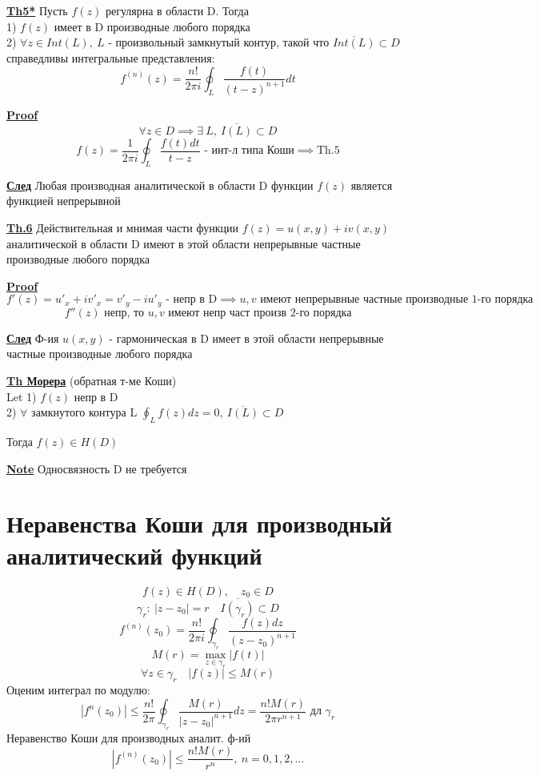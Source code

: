 \documentclass[a4paper]{article}
\begin{document}
\begin{tcolorbox}
\textbf{\underline{Th5*}} Пусть $ f(z) $ регулярна в области D. Тогда\\
1) $ f(z) $ имеет в D производные любого порядка\\
2) $ \forall z \in Int(L), \ L $ - произвольный замкнутый контур, такой что 
$ \overline{Int(L)} \subset D $ справедливы интегральные представления:
\[
    f^{(n)}(z) = \frac{n!}{2\pi i} \oint_L \frac{f(t)}{(t-z)^{n+1}} dt
\]

\textbf{\underline{Proof}}
\[
    \forall z \in D \implies \exists \ L, \ \overline{I(L)} \subset D
\]
\[
    f(z) = \frac{1}{2 \pi i} \oint_L \frac{f(t)dt}{t-z} \text{ - инт-л типа Коши}
    \implies \text{Th.5}
\]

\textbf{\underline{След}} Любая производная аналитической в области D функции $ f(z) $ является
функцией непрерывной
\end{tcolorbox}

\begin{tcolorbox}
\textbf{\underline{Th.6}} Действительная и мнимая части функции $ f(z) = u(x,y) + iv(x,y) $ 
аналитической в области D имеют в этой области непрерывные частные производные
любого порядка

\textbf{\underline{Proof}}
\[
    f'(z) = u'_x + iv'_x = v'_y - iu'_y \text{ - непр в D}
    \implies u,v \text{ имеют непрерывные частные производные 1-го порядка}
\]
\[
    f''(z) \text{ непр, то } u, v \text{ имеют непр част произв 2-го порядка}
\]

\textbf{\underline{След}} Ф-ия $ u(x,y) $ - гармоническая в D имеет в этой области
непрерывные частные производные любого порядка
\end{tcolorbox}

\begin{tcolorbox}
\textbf{\underline{Th Морера}} (обратная т-ме Коши)\\
Let 1) $ f(z) $ непр в D\\
2) $ \forall $ замкнутого контура L $ \oint_L f(z) dz = 0, \ \overline{I(L)} \subset D $ 

Тогда $ f(z) \in H(D) $ 

\textbf{\underline{Note}} Односвязность D не требуется
\end{tcolorbox}

\section*{\centering Неравенства Коши для производный аналитический функций}
\[
    f(z) \in H(D), \quad z_0 \in D
\]
\[
    \gamma_r: \ |z - z_0| = r \quad \overline{I(\gamma_r)} \subset D
\]
\[
    f^{(n)}(z_0) = \frac{n!}{2 \pi i} \oint_{\gamma_r} \frac{f(z)dz}{(z-z_0)^{n+1}} 
\]
\[
    M(r) = \max_{z \in \gamma_r} |f(t)|
\]
\[
    \forall z \in \gamma_r \quad |f(z)| \leq M(r)
\]
Оценим интеграл по модулю:
\[
    |f^{n}(z_0)| \leq \frac{n!}{2\pi} \oint_{\gamma_r} \frac{M(r)}{|z-z_0|^{n+1}} dz
    = \frac{n! M(r)}{2 \pi r^{n+1}} \text{ дл } \gamma_r
\]
Неравенство Коши для производных аналит. ф-ий
\[
    |f^{(n)}(z_0)| \leq \frac{n!M(r)}{r^{n}}, \ n = 0, 1, 2, \dots
\]
\end{document}
